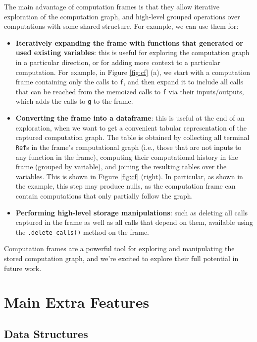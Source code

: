 The main advantage of computation frames is that they allow iterative
exploration of the computation graph, and high-level grouped operations over
computations with some shared structure. For example, we can use them for:
\begin{itemize}
\item \textbf{Iteratively expanding the frame with functions that generated or
used existing variables}: this is useful for exploring the computation graph in
a particular direction, or for adding more context to a particular computation.
For example, in Figure \ref{fig:cf} (a), we start with a computation frame
containing only the calls to \texttt{f}, and then expand it to include all calls
that can be reached from the memoized calls to \texttt{f} via their
inputs/outputs, which adds the calls to \texttt{g} to the frame.
\item \textbf{Converting the frame into a dataframe}: this is useful at the end
of an exploration, when we want to get a convenient tabular representation of
the captured computation graph. The table is obtained by collecting all terminal
\texttt{Ref}s in the frame's computational graph (i.e., those that are not
inputs to any function in the frame), computing their computational history in
the frame (grouped by variable), and joining the resulting tables over the
variables. This is shown in Figure \ref{fig:cf} (right). In particular, as shown
in the example, this step may produce nulls, as the computation frame can
contain computations that only partially follow the graph.
\item \textbf{Performing high-level storage manipulations}: such as deleting all
calls captured in the frame as well as all calls that depend on them, available
using the \verb|.delete_calls()| method on the frame.
\end{itemize}

Computation frames are a powerful tool for exploring and manipulating the stored
computation graph, and we're excited to explore their full potential in future
work.

\section{Main Extra Features}
\label{section:extra-features}

\subsection{Data Structures}
\label{subsection:data-structures}

